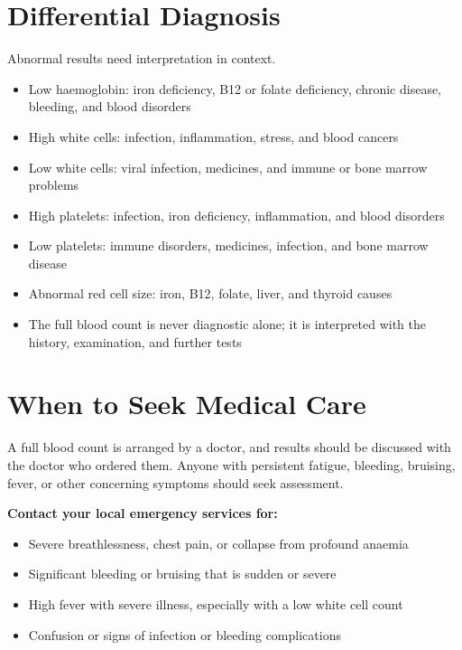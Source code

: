 \section*{Differential Diagnosis}
Abnormal results need interpretation in context.
\begin{itemize}
    \item Low haemoglobin: iron deficiency, B12 or folate deficiency, chronic disease, bleeding, and blood disorders
    \item High white cells: infection, inflammation, stress, and blood cancers
    \item Low white cells: viral infection, medicines, and immune or bone marrow problems
    \item High platelets: infection, iron deficiency, inflammation, and blood disorders
    \item Low platelets: immune disorders, medicines, infection, and bone marrow disease
    \item Abnormal red cell size: iron, B12, folate, liver, and thyroid causes
    \item The full blood count is never diagnostic alone; it is interpreted with the history, examination, and further tests
\end{itemize}

\section*{When to Seek Medical Care}
A full blood count is arranged by a doctor, and results should be discussed with the doctor who ordered them. Anyone with persistent fatigue, bleeding, bruising, fever, or other concerning symptoms should seek assessment.

\textbf{Contact your local emergency services for:}
\begin{itemize}
    \item Severe breathlessness, chest pain, or collapse from profound anaemia
    \item Significant bleeding or bruising that is sudden or severe
    \item High fever with severe illness, especially with a low white cell count
    \item Confusion or signs of infection or bleeding complications
\end{itemize}

